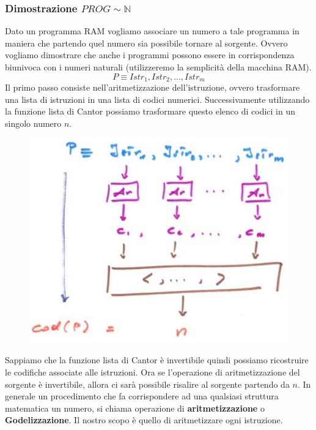 \documentclass{article}
\begin{document}
\subsubsection{Dimostrazione $PROG\sim\mathbb{N}$}
Dato un programma RAM vogliamo associare un numero a tale programma
in maniera che partendo quel numero sia possibile tornare al sorgente.
Ovvero vogliamo dimostrare che anche i programmi possono essere in corrispondenza biunivoca
con i numeri naturali (utilizzeremo la semplicità della macchina RAM).
$$P\equiv Istr_1,Istr_2,...,Istr_m$$
Il primo passo consiste nell'aritmetizzazione dell'istruzione, ovvero trasformare una lista
di istruzioni in una lista di codici numerici. Successivamente utilizzando la funzione lista
di Cantor possiamo trasformare questo elenco di codici in un singolo numero $n$.
\begin{figure}[H]
    \centering
    \includegraphics[scale=0.5]{images/PROG_to_num.png}
\end{figure}
Sappiamo che la funzione lista di Cantor è invertibile quindi possiamo ricostruire le codifiche
associate alle istruzioni. Ora se l'operazione di aritmetizzazione del sorgente è
invertibile, allora ci sarà possibile risalire al sorgente partendo da $n$.
\newline\newline
In generale un procedimento che fa corrispondere ad una qualsiasi struttura matematica
un numero, si chiama operazione di \textbf{aritmetizzazione} o \textbf{Godelizzazione}.
Il nostro scopo è quello di aritmetizzare ogni istruzione.
\end{document}
